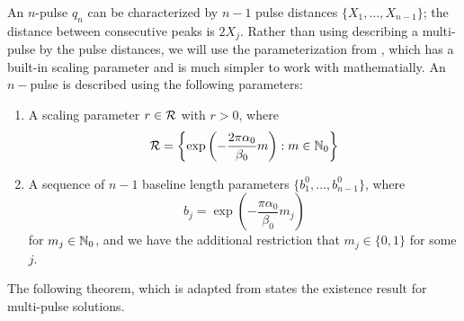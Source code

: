 \documentclass[thesis.tex]{subfiles}
\begin{document}
An $n$-pulse $q_n$ can be characterized by $n-1$ pulse distances $\{ X_1, \dots, X_{n-1} \}$; the distance between consecutive peaks is $2 X_j$. Rather than using describing a multi-pulse by the pulse distances, we will use the parameterization from \cite{SandstedeStrut}, which has a built-in scaling parameter and is much simpler to work with mathematially. An $n-$pulse is described using the following parameters:
\begin{enumerate}
\item A scaling parameter $r \in \mathcal{R}$ with $r > 0$, where
\[
\mathcal{R} = \left\{ \mathop\mathrm{exp}\nolimits\left(-\frac{2 \pi \alpha_0}{\beta_0}m \right) : m \in \mathbb{N}_0 \right\}
\]
\item A sequence of $n-1$ baseline length parameters $\{ b_1^0, \dots, b_{n-1}^0 \}$, where 
\[
b_j = \exp\left(-\frac{\pi \alpha_0}{\beta_0}m_j \right)
\]
for $m_j \in \mathbb{N}_0$, and we have the additional restriction that $m_j \in \{0, 1\}$ for some $j$.
\end{enumerate}

The following theorem, which is adapted from \cite[Theorem 3.6]{SandstedeStrut} states the existence result for multi-pulse solutions.
\end{document}
